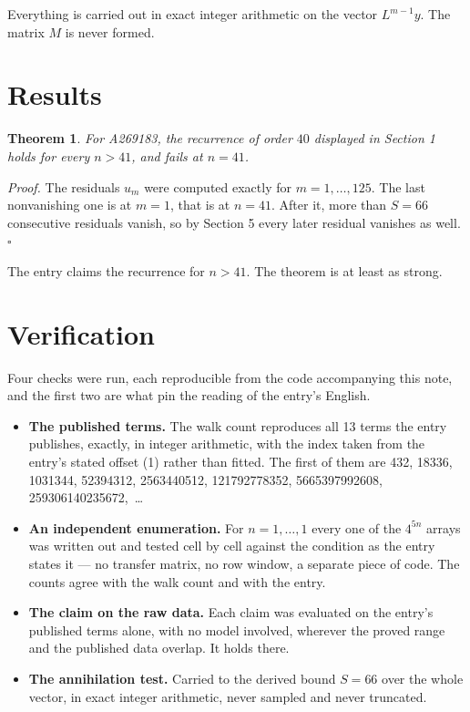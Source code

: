 \documentclass[11pt]{article}
\newtheorem{theorem}{Theorem}
\theoremstyle{definition}
\begin{document}
Everything is carried out in exact integer arithmetic on the vector $L^{m-1}y$. The matrix $M$ is never formed.

\section{Results}

\begin{theorem} For A269183, the recurrence of order $40$ displayed in Section 1 holds for every $n > 41$, and fails at $n = 41$.\end{theorem}

{\itshape Proof.} The residuals $u_m$ were computed exactly for $m = 1,\dots,125$. The last nonvanishing one is at $m = 1$, that is at $n = 41$. After it, more than $S = 66$ consecutive residuals vanish, so by Section 5 every later residual vanishes as well. $\square$

The entry claims the recurrence for $n > 41$. The theorem is at least as strong.

\section{Verification}

Four checks were run, each reproducible from the code accompanying this note, and the first two are what pin the reading of the entry's English.

\begin{itemize}

\item {\bfseries The published terms.} The walk count reproduces all 13 terms the entry publishes, exactly, in integer arithmetic, with the index taken from the entry's stated offset (1) rather than fitted. The first of them are 432, 18336, 1031344, 52394312, 2563440512, 121792778352, 5665397992608, 259306140235672,~\dots

\item {\bfseries An independent enumeration.} For $n = 1,\dots,1$ every one of the $4^{5n}$ arrays was written out and tested cell by cell against the condition as the entry states it --- no transfer matrix, no row window, a separate piece of code. The counts agree with the walk count and with the entry.

\item {\bfseries The claim on the raw data.} Each claim was evaluated on the entry's published terms alone, with no model involved, wherever the proved range and the published data overlap. It holds there.

\item {\bfseries The annihilation test.} Carried to the derived bound $S = 66$ over the whole vector, in exact integer arithmetic, never sampled and never truncated.

\end{itemize}
\end{document}
